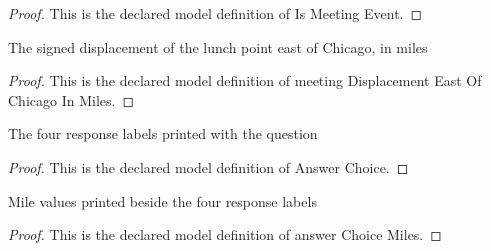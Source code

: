 \begin{proof}
  This is the declared model definition of Is Meeting Event.
\end{proof}
\begin{definition}
  \label{def:physics:phyx-mini-0830:phyxminiproblems-problemphyxmini0830-meetingdisplacementeastofchicagoinmiles}
  The signed displacement of the lunch point east of Chicago, in miles
\end{definition}
\begin{proof}
  This is the declared model definition of meeting Displacement East Of Chicago In Miles.
\end{proof}
\begin{definition}
  \label{def:physics:phyx-mini-0830:phyxminiproblems-problemphyxmini0830-answerchoice}
  The four response labels printed with the question
\end{definition}
\begin{proof}
  This is the declared model definition of Answer Choice.
\end{proof}
\begin{definition}
  \label{def:physics:phyx-mini-0830:phyxminiproblems-problemphyxmini0830-answerchoicemiles}
  Mile values printed beside the four response labels
\end{definition}
\begin{proof}
  This is the declared model definition of answer Choice Miles.
\end{proof}
